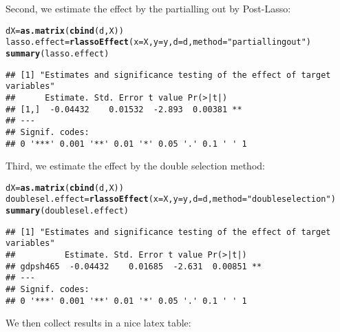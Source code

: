 \documentclass{amsart}\usepackage[]{graphicx}\usepackage[]{color}
\makeatletter
\newcommand{\hlstr}[1]{\textcolor[rgb]{0.192,0.494,0.8}{#1}}%
\newcommand{\hlstd}[1]{\textcolor[rgb]{0.345,0.345,0.345}{#1}}%
\newcommand{\hlkwb}[1]{\textcolor[rgb]{0.69,0.353,0.396}{#1}}%
\newcommand{\hlkwc}[1]{\textcolor[rgb]{0.333,0.667,0.333}{#1}}%
\newcommand{\hlkwd}[1]{\textcolor[rgb]{0.737,0.353,0.396}{\textbf{#1}}}%
\newenvironment{kframe}{%
 \def\at@end@of@kframe{}%
 \ifinner\ifhmode%
  \def\at@end@of@kframe{\end{minipage}}%
  \begin{minipage}{\columnwidth}%
 \fi\fi%
 \def\FrameCommand##1{\hskip\@totalleftmargin \hskip-\fboxsep
 \colorbox{shadecolor}{##1}\hskip-\fboxsep
     \hskip-\linewidth \hskip-\@totalleftmargin \hskip\columnwidth}%
 \MakeFramed {\advance\hsize-\width
   \@totalleftmargin\z@ \linewidth\hsize
   \@setminipage}}%
 {\par\unskip\endMakeFramed%
 \at@end@of@kframe}
\newenvironment{knitrout}{}{} %
\makeatother
\begin{document}
Second, we estimate the effect by the partialling out by Post-Lasso: 
\begin{knitrout}
\color{fgcolor}\begin{kframe}
\begin{alltt}
\hlstd{dX} \hlkwb{=} \hlkwd{as.matrix}\hlstd{(}\hlkwd{cbind}\hlstd{(d, X))}
\hlstd{lasso.effect} \hlkwb{=} \hlkwd{rlassoEffect}\hlstd{(}\hlkwc{x} \hlstd{= X,} \hlkwc{y} \hlstd{= y,} \hlkwc{d} \hlstd{= d,} \hlkwc{method} \hlstd{=} \hlstr{"partialling out"}\hlstd{)}
\hlkwd{summary}\hlstd{(lasso.effect)}
\end{alltt}
\begin{verbatim}
## [1] "Estimates and significance testing of the effect of target variables"
##      Estimate. Std. Error t value Pr(>|t|)   
## [1,]  -0.04432    0.01532  -2.893  0.00381 **
## ---
## Signif. codes:  
## 0 '***' 0.001 '**' 0.01 '*' 0.05 '.' 0.1 ' ' 1
\end{verbatim}
\end{kframe}
\end{knitrout}


Third, we estimate the effect by the double selection method:
\begin{knitrout}
\color{fgcolor}\begin{kframe}
\begin{alltt}
\hlstd{dX} \hlkwb{=} \hlkwd{as.matrix}\hlstd{(}\hlkwd{cbind}\hlstd{(d, X))}
\hlstd{doublesel.effect} \hlkwb{=} \hlkwd{rlassoEffect}\hlstd{(}\hlkwc{x} \hlstd{= X,} \hlkwc{y} \hlstd{= y,} \hlkwc{d} \hlstd{= d,} \hlkwc{method} \hlstd{=} \hlstr{"double selection"}\hlstd{)}
\hlkwd{summary}\hlstd{(doublesel.effect)}
\end{alltt}
\begin{verbatim}
## [1] "Estimates and significance testing of the effect of target variables"
##          Estimate. Std. Error t value Pr(>|t|)   
## gdpsh465  -0.04432    0.01685  -2.631  0.00851 **
## ---
## Signif. codes:  
## 0 '***' 0.001 '**' 0.01 '*' 0.05 '.' 0.1 ' ' 1
\end{verbatim}
\end{kframe}
\end{knitrout}

We then collect results in a nice latex table:
\end{document}
